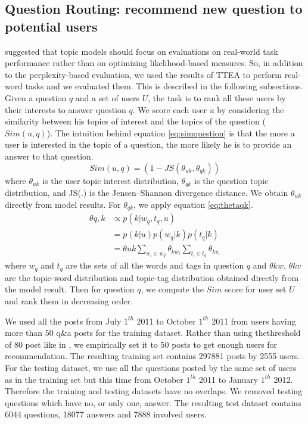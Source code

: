 {{{{{{{\subsection{Question Routing: recommend new question to potential users}
\label{sec:qrouting}
\cite{Chang09} suggested that topic models should focus on evaluations on real-world task performance rather than on optimizing likelihood-based measures. So, in addition to the perplexity-based evaluation, we used the results of TTEA to perform real-word tasks and we evaluated them. This is described in the following subsections.
Given a question $q$ and a set of users $U$, the task is to rank all these users by their interests to answer question $q$.
We score each user $u$ by considering the similarity between his topics of interest and the topics of the question ($Sim(u,q)$). The intuition behind equation \ref{eq:simquestion} is that the more a user is interested in the topic of a question, the more likely he is to provide an answer to that question.
\begin{equation}
Sim(u,q) = (1 -JS(\theta_{uk},\theta_{qk}))
\label{eq:simquestion}
\end{equation}
where $\theta_{uk}$ is the user topic interest distribution, $\theta_{qk}$ is the question topic distribution, and JS(.) is the Jensen–Shannon divergence distance. We obtain $\theta_{uk}$ directly from model results. For $\theta_{qk}$, we apply equation \ref{eq:thetaqk}.
\begin{equation}
\begin{split}
\theta{q,k} &\propto p(k|w_q,t_q,u) \\
           &=p(k|u)p(w_q|k)p(t_q|k) \\
           &= \theta{uk} \sum_{w_i \in w_q} \theta_{kw_i} \sum_{t_i \in t_q} \theta_{kv_i} 
\end{split}
\label{eq:thetaqk}
\end{equation}
where $w_q$ and $t_q$ are the sets of all the words and tags in question $q$ and $\theta{kw}$, $\theta{kv}$ are the topic-word distribution and topic-tag distribution obtained directly from the model result. Then for question $q$, we compute the $Sim$ score for user set $U$ and rank them in decreasing order. %


We used all the posts from July $1^{th}$ 2011 to October $1^{th}$ 2011 from users having more than 50 q\&a posts for the training dataset. Rather than using thethreshold of 80 post like in \cite{yang2013cqarank}, we empirically set it to 50 posts to get enough users for recommendation. 
The resulting training set contains 297881 posts by 2555 users. For the testing dataset, we use all the questions posted by the same set of users as in the training set but this time from October $1^{th}$ 2011 to January $1^{th}$ 2012. Therefore the training and testing datasets have no overlaps. We removed testing questions which have no, or only one, answer. The resulting test dataset contains 6044 questions, 18077 answers and 7888 involved users. 

}}}}}}}
